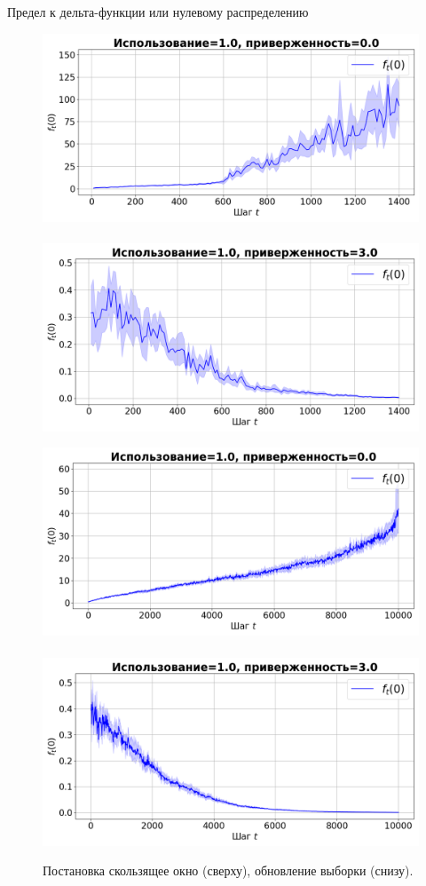 \documentclass[aspectratio=169]{beamer}
\begin{document}
\begin{frame}{Предел к дельта-функции или нулевому распределению}
    \footnotesize
    \vspace{-2mm}
        \begin{figure}
            \centering
            \includegraphics[width=0.49\linewidth]{fig/ft0_sw_synthetic_sgd_model_50_1.0_0.0.png}~
            \includegraphics[width=0.49\linewidth]{fig/ft0_sw_synthetic_sgd_model_50_1.0_3.0.png}

            \includegraphics[width=0.49\linewidth]{fig/ft0_su_synthetic_sgd_model_50_1.0_0.0.png}~
            \includegraphics[width=0.49\linewidth]{fig/ft0_su_synthetic_sgd_model_50_1.0_3.0.png}
            \vspace{-4mm}
            \caption{Постановка скользящее окно (сверху), обновление выборки (снизу).}
        \end{figure}
    \end{frame}
\end{document}

